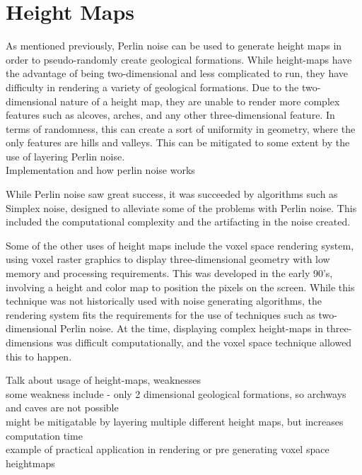 \documentclass[12pt]{report}
\begin{document}
		
		
	
	\let\clearpage\relax
	\chapter{Height Maps}
		As mentioned previously, Perlin noise can be used to generate height maps in order to pseudo-randomly create geological formations. While height-maps have the advantage of being two-dimensional and less complicated to run, they have difficulty in rendering a variety of geological formations. Due to the two-dimensional nature of a height map, they are unable to render more complex features such as alcoves, arches, and any other three-dimensional feature. In terms of randomness, this can create a sort of uniformity in geometry, where the only features are hills and valleys. This can be mitigated to some extent by the use of layering Perlin noise. \\
		
		\noindent Implementation and how perlin noise works
		
		\noindent While Perlin noise saw great success, it was succeeded by algorithms such as Simplex noise, designed to alleviate some of the problems with Perlin noise. This included the computational complexity and the artifacting in the noise created. 
		
		
		\noindent Some of the other uses of height maps include the voxel space rendering system, using voxel raster graphics to display three-dimensional geometry with low memory and processing requirements. This was developed in the early 90's, involving a height and color map to position the pixels on the screen. While this technique was not historically used with noise generating algorithms, the rendering system fits the requirements for the use of techniques such as two-dimensional Perlin noise. At the time, displaying complex height-maps in three-dimensions was difficult computationally, and the voxel space technique allowed this to happen. 
		
		
		\noindent Talk about usage of height-maps, weaknesses\\
		some weakness include - only 2 dimensional geological formations, so archways and caves are not possible \\
		might be mitigatable by layering multiple different height maps, but increases computation time\\
		example of practical application in rendering or pre generating voxel space heightmaps \\
		\\
		
\end{document}
